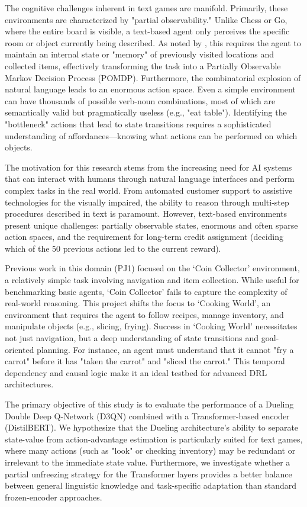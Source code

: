 \documentclass[11pt,a4paper]{article}
\begin{document}
The cognitive challenges inherent in text games are manifold. Primarily, these environments are characterized by "partial observability." Unlike Chess or Go, where the entire board is visible, a text-based agent only perceives the specific room or object currently being described. As noted by \citet{cote2018textworld}, this requires the agent to maintain an internal state or "memory" of previously visited locations and collected items, effectively transforming the task into a Partially Observable Markov Decision Process (POMDP). Furthermore, the combinatorial explosion of natural language leads to an enormous action space. Even a simple environment can have thousands of possible verb-noun combinations, most of which are semantically valid but pragmatically useless (e.g., "eat table"). Identifying the "bottleneck" actions that lead to state transitions requires a sophisticated understanding of affordances—knowing what actions can be performed on which objects.

The motivation for this research stems from the increasing need for AI systems that can interact with humans through natural language interfaces and perform complex tasks in the real world. From automated customer support to assistive technologies for the visually impaired, the ability to reason through multi-step procedures described in text is paramount. However, text-based environments present unique challenges: partially observable states, enormous and often sparse action spaces, and the requirement for long-term credit assignment (deciding which of the 50 previous actions led to the current reward).

Previous work in this domain (PJ1) focused on the `Coin Collector' environment, a relatively simple task involving navigation and item collection. While useful for benchmarking basic agents, `Coin Collector' fails to capture the complexity of real-world reasoning. This project shifts the focus to `Cooking World', an environment that requires the agent to follow recipes, manage inventory, and manipulate objects (e.g., slicing, frying). Success in `Cooking World' necessitates not just navigation, but a deep understanding of state transitions and goal-oriented planning. For instance, an agent must understand that it cannot "fry a carrot" before it has "taken the carrot" and "sliced the carrot." This temporal dependency and causal logic make it an ideal testbed for advanced DRL architectures.

The primary objective of this study is to evaluate the performance of a Dueling Double Deep Q-Network (D3QN) combined with a Transformer-based encoder (DistilBERT). We hypothesize that the Dueling architecture's ability to separate state-value from action-advantage estimation is particularly suited for text games, where many actions (such as "look" or checking inventory) may be redundant or irrelevant to the immediate state value. Furthermore, we investigate whether a partial unfreezing strategy for the Transformer layers provides a better balance between general linguistic knowledge and task-specific adaptation than standard frozen-encoder approaches.
\end{document}
